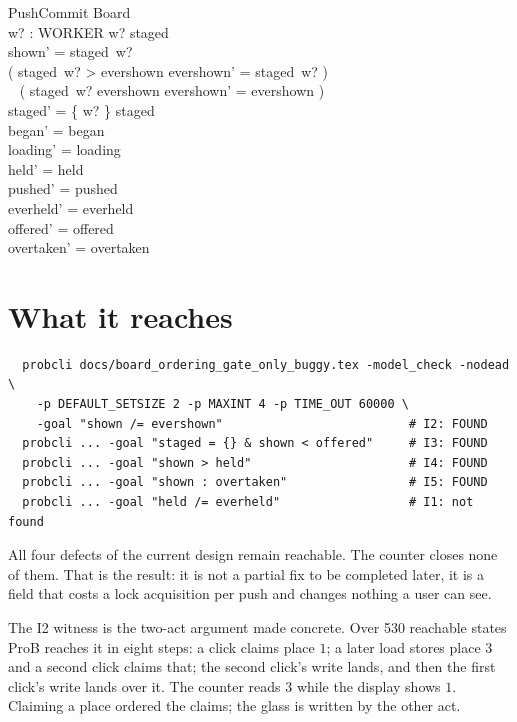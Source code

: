 \documentclass[a4paper,10pt,fleqn]{article}
\begin{document}
\begin{schema}{PushCommit}
  \Delta Board \\
  w? : WORKER
\where
  w? \in \dom staged \\
  shown' = staged~w? \\
  ( staged~w? > evershown \land evershown' = staged~w? ) \lor \\
  \quad~ ( staged~w? \leq evershown \land evershown' = evershown ) \\
  staged' = \{ w? \} \ndres staged \\
  began' = began \\
  loading' = loading \\
  held' = held \\
  pushed' = pushed \\
  everheld' = everheld \\
  offered' = offered \\
  overtaken' = overtaken
\end{schema}

\section{What it reaches}

\begin{verbatim}
  probcli docs/board_ordering_gate_only_buggy.tex -model_check -nodead \
    -p DEFAULT_SETSIZE 2 -p MAXINT 4 -p TIME_OUT 60000 \
    -goal "shown /= evershown"                          # I2: FOUND
  probcli ... -goal "staged = {} & shown < offered"     # I3: FOUND
  probcli ... -goal "shown > held"                      # I4: FOUND
  probcli ... -goal "shown : overtaken"                 # I5: FOUND
  probcli ... -goal "held /= everheld"                  # I1: not found
\end{verbatim}

All four defects of the current design remain reachable. The counter closes
none of them. That is the result: it is not a partial fix to be completed
later, it is a field that costs a lock acquisition per push and changes nothing
a user can see.

The I2 witness is the two-act argument made concrete. Over 530 reachable states
ProB reaches it in eight steps: a click claims place $1$; a later load stores
place $3$ and a second click claims that; the second click's write lands, and
then the first click's write lands over it. The counter reads $3$ while the
display shows $1$. Claiming a place ordered the claims; the glass is written by
the other act.
\end{document}
